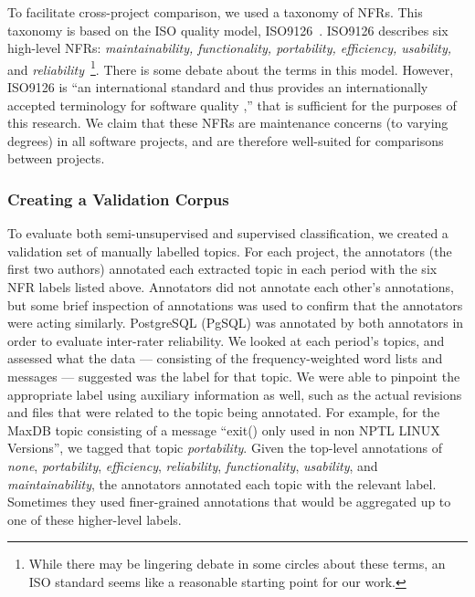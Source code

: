 \documentclass[smallextended]{svjour3}       %
\begin{document}

To facilitate cross-project comparison, we used a taxonomy of NFRs. This taxonomy is based on the ISO quality model, ISO9126~\cite{iso9126}. 
ISO9126 describes six high-level NFRs: \emph{maintainability, functionality,
portability, efficiency, usability,} and \emph{reliability}~\footnote{While there may be lingering debate in some circles about these terms, an ISO standard
seems like a reasonable starting point for our work.}.
There is some debate about the terms in this model. 
However, ISO9126 is ``an international standard and thus provides an 
internationally accepted terminology for software quality \cite[p. 58]{Boegh2008},'' that is sufficient for the purposes of this research.  
We claim that these NFRs are maintenance concerns (to varying degrees) in all software projects, and are therefore well-suited for comparisons between
projects.


\subsubsection{Creating a Validation Corpus}
To evaluate both semi-unsupervised and supervised classification, we
created a validation set of manually labelled topics. For each project,
 the annotators (the first two authors) annotated each extracted topic in each period with
the six NFR labels listed above.
Annotators did not annotate each other's annotations, but some brief
inspection of annotations was used to confirm that the annotators were
acting similarly. PostgreSQL (PgSQL) was annotated by both annotators in order
to evaluate inter-rater reliability.
We looked at each period's topics, and assessed what the data ---
consisting of the frequency-weighted word lists and messages ---
suggested was the label for that topic. 
We were able to pinpoint the appropriate label using auxiliary information as well, such as the actual revisions and files that were related to the
topic being annotated.
For example, for the MaxDB topic consisting of a message ``exit() only
used in non NPTL LINUX Versions'', we tagged that topic
\emph{portability}. 
Given the top-level annotations of \emph{none}, \emph{portability},
\emph{efficiency}, \emph{reliability}, \emph{functionality},
\emph{usability}, and \emph{maintainability}, the annotators annotated each topic
with the relevant label. Sometimes they used finer-grained
annotations that would be aggregated up to one of these higher-level labels.
\end{document}
